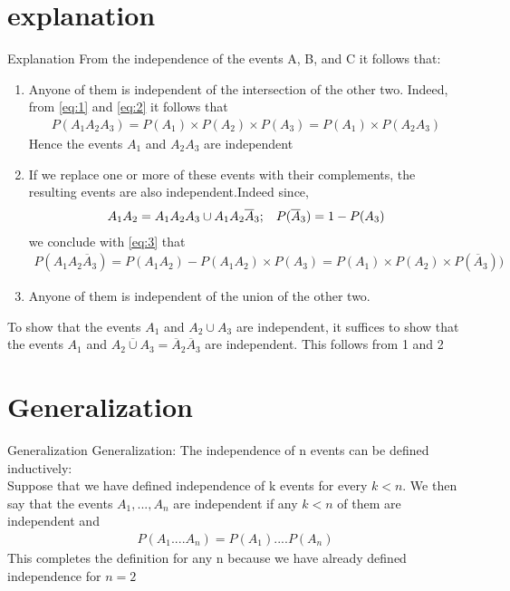 \documentclass{beamer}
\begin{document}
\section{explanation}
\begin{frame}{Explanation}
 From the independence of the events A, B, and C it follows that: \\
 \begin{enumerate}
     \item 
     Anyone of them is independent of the intersection of the other two.
     Indeed, from \eqref{eq:1} and \eqref{eq:2} it follows that 
     \begin{align}
         P(A_1A_2A_3) = P(A_1)\times P(A_2)\times P(A_3) = P(A_1)\times P(A_2A_3)\label{eq:3}
     \end{align}
     Hence the events $A_1$ and $A_2 A_3$ are independent
     
     \item
     If we replace one or more of these events with their complements, the resulting events are also independent.Indeed since,
     \begin{align}
         A_1A_2= A_1A_2A_3 \cup A_1A_2\overline A_3; \hspace{3mm}P(\overline A_3)=1 -P(A_3)\nonumber
     \end{align}
     we conclude with \eqref{eq:3} that 
     \begin{align}
         P(A_1A_2\overline A_3)=P(A_1A_2) -P(A_1A_2)\times P(A_3)=P(A_1)\times P(A_2)\times P(\overline A_3))\nonumber
     \end{align}
     
     \item
      Anyone of them is independent of the union of the other two. 


    \end{enumerate}
 

\end{frame}

\begin{frame}[t]{}
 To show that the events $A_1$ and $A_2\cup A_3$ are independent, it suffices to show that the events $A_1$ and $\overline{A_2\cup A_3}=\overline A_2\overline A_3$ are independent. This follows from 1 and 2


\end{frame}

\section{Generalization}
\begin{frame}{Generalization}
    Generalization: The independence of n events can be defined inductively:\\ Suppose that 
    we have defined independence of k events for every $k < n$. We then say that the events $A_1, ... , A_n$ are independent if any $k < n$ of them are independent and 
    \begin{align}
        P(A_1....A_n)=P(A_1)....P(A_n)
    \end{align}
    This completes the definition for any n because we have already defined independence for $n=2$

\end{frame}
\end{document}
